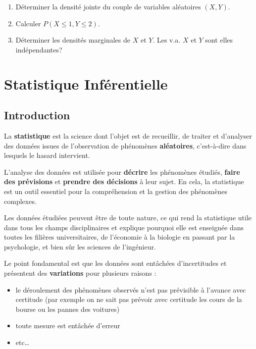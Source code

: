 \documentclass[]{book}
\providecommand{\tightlist}{%
  \setlength{\itemsep}{0pt}\setlength{\parskip}{0pt}}
\theoremstyle{magentacolor}
\theoremstyle{proprie}
\theoremstyle{exstyle}
\theoremstyle{exostyle}
\theoremstyle{definition}
\theoremstyle{definition}
\theoremstyle{definition}
\theoremstyle{remark}
\begin{document}
\begin{enumerate}
\def\labelenumi{\arabic{enumi}.}
\item
  Déterminer la densité jointe du couple de variables aléatoires
  \((X,Y)\).
\item
  Calculer \(P(X \le 1, Y\le 2)\).
\item
  Déterminer les densités marginales de \(X\) et \(Y\). Les v.a. \(X\) et
  \(Y\) sont elles indépendantes?
\end{enumerate}

\hypertarget{part-statistique-inferentielle}{%
\part*{Statistique Inférentielle}\label{part-statistique-inferentielle}}

\hypertarget{introduction-1}{%
\chapter{Introduction}\label{introduction-1}}

La \textbf{statistique} est la science dont l'objet est de recueillir, de traiter et d'analyser des données issues de l'observation de phénomènes \textbf{aléatoires}, c'est-à-dire dans lesquels le hasard intervient.

L'analyse des données est utilisée pour \textbf{décrire} les phénomènes étudiés, \textbf{faire des prévisions} et \textbf{prendre des décisions} à leur sujet. En cela, la statistique est un outil essentiel pour la compréhension et la gestion des phénomènes complexes.

Les données étudiées peuvent être de toute nature, ce qui rend la statistique utile dans tous les champs disciplinaires et explique pourquoi elle est enseignée dans toutes les filières universitaires, de l'économie à la biologie en passant par la psychologie, et bien sûr les sciences de l'ingénieur.

Le point fondamental est que les données sont entâchées d'incertitudes et présentent des \textbf{variations} pour plusieurs raisons :

\begin{itemize}
\tightlist
\item
  le déroulement des phénomènes observés n'est pas prévisible à l'avance avec certitude (par exemple on ne sait pas prévoir avec certitude les cours de la bourse ou les pannes des voitures)
\item
  toute mesure est entâchée d'erreur
\item
  etc\ldots{}
\end{itemize}
\end{document}
